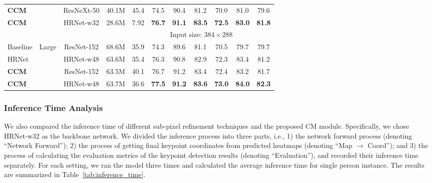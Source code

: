 \documentclass[twocolumn]{svjour3}          \smartqed  \usepackage{natbib}
\begin{document}
\begin{table*}[htbp]
\begin{tabular}{llccccccccc}
    \textbf{CCM} & \multicolumn{1}{c}{}  & ResNeXt-50 & 40.1M & 45.4 & 74.5         & 90.4         & 81.2         &  70.0        &  81.0       & 79.6  \\
    \textbf{CCM} & \multicolumn{1}{c}{}  & HRNet-w32 & 28.6M & 7.92 & \textbf{76.7}         & \textbf{91.1}         & \textbf{83.5}         &  \textbf{72.5}        &  \textbf{83.0}       & \textbf{81.8}  \\
    \midrule
    \midrule
    & &  & & \multicolumn{7}{c}{Input size: $384\times288$} \\
    Baseline \citep{xiao2018simple} & \multicolumn{1}{c}{\multirow{4}[0]{*}{Large}} & ResNet-152 & 68.6M & 35.9 & 74.3     &  89.6     &  81.1     &  70.5     &  79.7     & 79.7 \\
    HRNet \citep{sun2019deep} & \multicolumn{1}{c}{} & HRNet-w48 & 63.6M & 35.4 & 76.3     &  90.8     &  82.9     &  {72.3}     &  {83.4}    & 81.2 \\
    \textbf{CCM} & \multicolumn{1}{c}{} & ResNet-152 & 63.5M & 40.1 & {76.7}     &  {91.2}     &  {83.4}     &  {72.4}     &  83.2    & {81.7} \\
    \textbf{CCM} & \multicolumn{1}{c}{} & HRNet-w48 & 63.7M & 36.6 & \textbf{77.5}     &  \textbf{91.2}     &  \textbf{83.6}     &  \textbf{73.0}     &  \textbf{84.0}    & \textbf{82.3} \\
    \bottomrule
    \end{tabular}\label{tab:SOTA_minival}\end{table*}

\subsubsection{Inference Time Analysis}
\label{subsubsec:inferencetime}
We also compared the inference time of different sub-pixel refinement techniques and the proposed CM module. Specifically, we chose HRNet-w32 as the backbone network. We divided the inference process into three parts, i.e., 1) the network forward process (denoting ``Network Forward''); 2) the process of getting final keypoint coordinates from predicted heatmaps (denoting ``Map $\rightarrow$ Coord''); and 3) the process of calculating the evaluation metrics of the keypoint detection results (denoting ``Evaluation''), and recorded their inference time separately. For each setting, we ran the model three times and calculated the average inference time for single person instance. The results are summarized in Table~\ref{tab:inference_time}.
\end{document}
